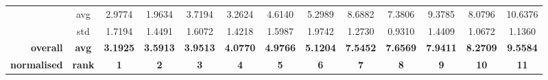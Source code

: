 \begin{table}[htbp]
{\begin{tabular}{rcccccccccccc}
                                                     & avg                                    & 2.9774                                                                             & \cellcolor[rgb]{ .776,  .937,  .808}\textcolor[rgb]{ 0,  .38,  0}{1.9634} & 3.7194                                                                    & 3.2624                                                                    & 4.6140                                        & 5.2989                                      & 8.6882                                         & 7.3806                                         & 9.3785                                         & 8.0796                                         & 10.6376                                        \\
                                                     & std                                    & 1.7194                                                                             & 1.4491                                                                    & 1.6072                                                                    & 1.4218                                                                    & 1.5987                                        & 1.9742                                      & 1.2730                                         & 0.9310                                         & 1.4409                                         & 1.0672                                         & 1.1360                                         \\
                  \midrule
                  \textbf{overall}                   & \textbf{avg}                           & \cellcolor[rgb]{ .776,  .937,  .808}\textcolor[rgb]{ 0,  .38,  0}{\textbf{3.1925}} & \textbf{3.5913}                                                           & \textbf{3.9513}                                                           & \textbf{4.0770}                                                           & \textbf{4.9766}                               & \textbf{5.1204}                             & \textbf{7.5452}                                & \textbf{7.6569}                                & \textbf{7.9411}                                & \textbf{8.2709}                                & \textbf{9.5584}                                \\
                  \textbf{normalised}                & \textbf{rank}                          & \cellcolor[rgb]{ .388,  .745,  .482}\textbf{1}                                     & \cellcolor[rgb]{ .51,  .78,  .486}\textbf{2}                              & \cellcolor[rgb]{ .631,  .816,  .494}\textbf{3}                            & \cellcolor[rgb]{ .753,  .851,  .502}\textbf{4}                            & \cellcolor[rgb]{ .875,  .886,  .51}\textbf{5} & \cellcolor[rgb]{ 1,  .922,  .518}\textbf{6} & \cellcolor[rgb]{ .996,  .824,  .502}\textbf{7} & \cellcolor[rgb]{ .992,  .722,  .482}\textbf{8} & \cellcolor[rgb]{ .984,  .616,  .459}\textbf{9} & \cellcolor[rgb]{ .98,  .514,  .439}\textbf{10} & \cellcolor[rgb]{ .973,  .412,  .42}\textbf{11} \\

\end{tabular}}
\end{table}
